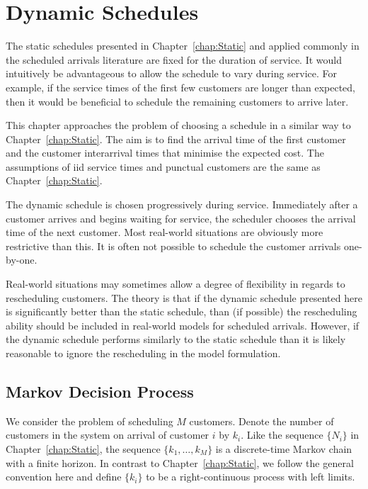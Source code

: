 \chapter{Dynamic Schedules}
\label{chap:Dynamic}
The static schedules presented in Chapter~\ref{chap:Static} and applied commonly in the scheduled arrivals literature are fixed for the duration of service. It would intuitively be advantageous to allow the schedule to vary during service. For example, if the service times of the first few customers are longer than expected, then it would be beneficial to schedule the remaining customers to arrive later.

This chapter approaches the problem of choosing a schedule in a similar way to Chapter~\ref{chap:Static}. The aim is to find the arrival time of the first customer and the customer interarrival times that minimise the expected cost. The assumptions of iid service times and punctual customers are the same as Chapter~\ref{chap:Static}.

The dynamic schedule is chosen progressively during service. Immediately after a customer arrives and begins waiting for service, the scheduler chooses the arrival time of the next customer. Most real-world situations are obviously more restrictive than this. It is often not possible to schedule the customer arrivals one-by-one.

Real-world situations may sometimes allow a degree of flexibility in regards to rescheduling customers. The theory is that if the dynamic schedule presented here is significantly better than the static schedule, than (if possible) the rescheduling ability should be included in real-world models for scheduled arrivals. However, if the dynamic schedule performs similarly to the static schedule than it is likely reasonable to ignore the rescheduling in the model formulation.

\section{Markov Decision Process}
We consider the problem of scheduling $M$ customers. Denote the number of customers in the system on arrival of customer $i$ by $k_{i}$. Like the sequence $\{ N_{i} \}$ in Chapter~\ref{chap:Static}, the sequence $\{ k_{1}, \ldots, k_{M} \}$ is a discrete-time Markov chain with a finite horizon. In contrast to Chapter~\ref{chap:Static}, we follow the general convention here and define $\{ k_{i} \}$ to be a right-continuous process with left limits.

